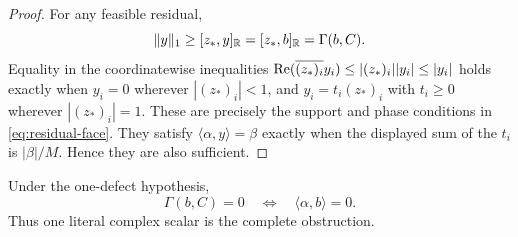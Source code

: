 \begin{proof}
For any feasible residual,
\[
 \|y\|_1
 \ge [z_*,y]_{\mathbb R}
 = [z_*,b]_{\mathbb R}
 =\Gamma(b,C).
\]
Equality in the coordinatewise inequalities
\(\operatorname{Re}(\overline{(z_*)_i}y_i)\le
 |(z_*)_i||y_i|\le|y_i|\)
holds exactly when \(y_i=0\) wherever \(|(z_*)_i|<1\), and
\(y_i=t_i(z_*)_i\) with \(t_i\ge0\) wherever
\(|(z_*)_i|=1\).  These are precisely the support and phase conditions
in \eqref{eq:residual-face}.  They satisfy
\(\langle\alpha,y\rangle=\beta\) exactly when the displayed sum of the
\(t_i\) is \(|\beta|/M\).  Hence they are also sufficient.
\end{proof}

\begin{corollary}
Under the one-defect hypothesis,
\[
 \Gamma(b,C)=0
 \quad\Longleftrightarrow\quad
 \langle\alpha,b\rangle=0.
\]
Thus one literal complex scalar is the complete obstruction.
\end{corollary}
